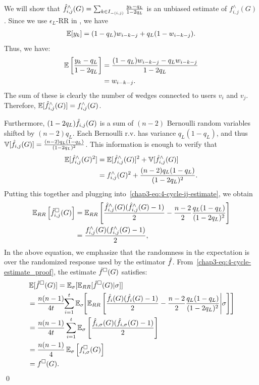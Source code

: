     We will show that $\hat{f}_{i,j}^\wedge(G) = \sum_{k \in I_{-(i,j)}}
    \frac{y_k-q_L}{1-2q_L}$ is an unbiased estimate of $f_{i,j}^\wedge(G)$.
    Since we use $\epsilon_L$-RR in \AlgWS{}, we have
    \begin{align*}
      \operatorname{\mathbb{E}}[y_{k}] = (1-q_L) w_{i-k-j} + q_L (1-w_{i-k-j}).
    \end{align*}
    Thus,  we have:
    \begin{align*}
        \operatorname{\mathbb{E}}\left[\frac{y_{k} - q_L}{1-2q_L}\right]
        &= \frac{(1-q_L) w_{i-k-j} - q_L w_{i-k-j}}{1-2q_L} \\
        &= w_{i-k-j}.
    \end{align*}
    The sum of these is clearly the number of wedges connected to users $v_i$ and $v_j$.
    Therefore, $\operatorname{\mathbb{E}}[\hat{f}_{i,j}^\wedge(G)] = f_{i,j}^\wedge(G)$.

    Furthermore, $(1-2q_L)\hat{f}_{i,j}(G)$ is a sum of $(n-2)$ Bernoulli random
    variables shifted by $(n-2)q_L$. Each Bernoulli r.v. has variance
    $q_L(1-q_L)$, and thus $\operatorname{\mathbb{V}}[\hat{f}_{i,j}(G)] = \frac{(n-2)q_L(1-q_L)}{(1-2q_L)^2}$.
    This information is enough to verify that
    \begin{align*}
        \operatorname{\mathbb{E}}[\hat{f}_{i,j}^\wedge(G)^2] &= \operatorname{\mathbb{E}}[\hat{f}_{i,j}^\wedge(G)]^2 + \operatorname{\mathbb{V}}[\hat{f}_{i,j}^\wedge(G)] \\
        &= f_{i,j}^\wedge(G)^2 + \frac{(n-2)q_L(1-q_L)}{(1-2q_L)^2}.
    \end{align*}
    Putting this together and plugging into~\eqref{chap3-eq:4-cycle-ij-estimate}, we
    obtain
    \begin{align}
        \operatorname{\mathbb{E}}_{RR}\left[\hat{f}^\square_{i,j}(G)\right] &=
        \operatorname{\mathbb{E}}_{RR}\left[\frac{\hat{f}^\wedge_{i,j}(G)(\hat{f}^\wedge_{i,j}(G)-1)}{2} -
        \frac{n-2}{2}\frac{q_L(1-q_L)}{(1-2q_L)^2} \right] \nonumber \\
        &=
        \frac{f^\wedge_{i,j}(G)(f_{i,j}^\wedge(G)-1)}{2},\label{chap3-eq:4-cycle-estimate_proof}
    \end{align}
    In the above equation, we emphasize that the randomness in the expectation is over
    the randomized response used by the estimator $\hat{f}$.
    From~\eqref{chap3-eq:4-cycle-estimate_proof}, the estimate $\hat{f}^\square(G)$ satisfies:
    \begin{align*}
      &\operatorname{\mathbb{E}}[\hat{f}^\square(G)] = \operatorname{\mathbb{E}}_\sigma[\operatorname{\mathbb{E}}_{RR}[\hat{f}^\square(G)|\sigma]] \\
        &= \frac{n(n-1)}{4t} \hspace{-1mm}\sum_{i=1}^t \operatorname{\mathbb{E}}_{\sigma}\hspace{-1mm}\left[\operatorname{\mathbb{E}}_{RR}\left[
          \frac{\hat{f}_i(G)(\hat{f}_{i}(G)-1)}{2} - \frac{n-2}{2}\frac{q_L(1-q_L)}{(1-2q_L)^2} \middle| \sigma\right]\right] \\
        &= \frac{n(n-1)}{4t} \sum_{i=1}^t
        \operatorname{\mathbb{E}}_\sigma\left[\frac{\hat{f}_{i,\sigma}(G)(\hat{f}_{i,\sigma}(G)-1)}{2}\right] \\
        &= \frac{n(n-1)}{4}\operatorname{\mathbb{E}}_{\sigma}\left[f_{i,\sigma}^\square(G)\right] \\
        &= f^\square(G).
    \end{align*}\qed


